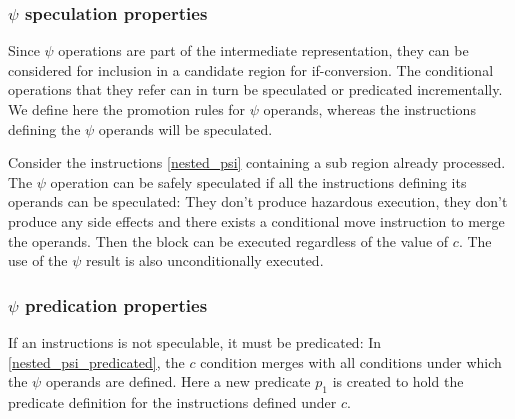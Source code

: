 



\subsubsection{$\psi$ speculation properties}

Since $\psi$ operations are part of the intermediate representation, they can be considered for inclusion in a candidate region for if-conversion. The conditional operations that they refer can in turn be speculated or predicated incrementally. We define here the promotion rules for $\psi$ operands, whereas the instructions defining the $\psi$ operands will be speculated.

Consider the instructions \ref{nested_psi} containing a sub region already processed. The $\psi$ operation can be safely speculated if all the instructions defining its operands can be speculated: They don't produce hazardous execution, they don't produce any side effects and there exists a conditional move instruction to merge the operands. Then the block can be executed regardless of the value of $c$. The use of the $\psi$ result is also unconditionally executed.

\subsubsection{$\psi$ predication properties}

If an instructions is not speculable, it must be predicated:
In \ref{nested_psi_predicated}, the $c$ condition merges with all conditions under which the $\psi$ operands are defined. Here a new predicate $p_1$ is created to hold the predicate definition for the instructions defined under $c$. 


